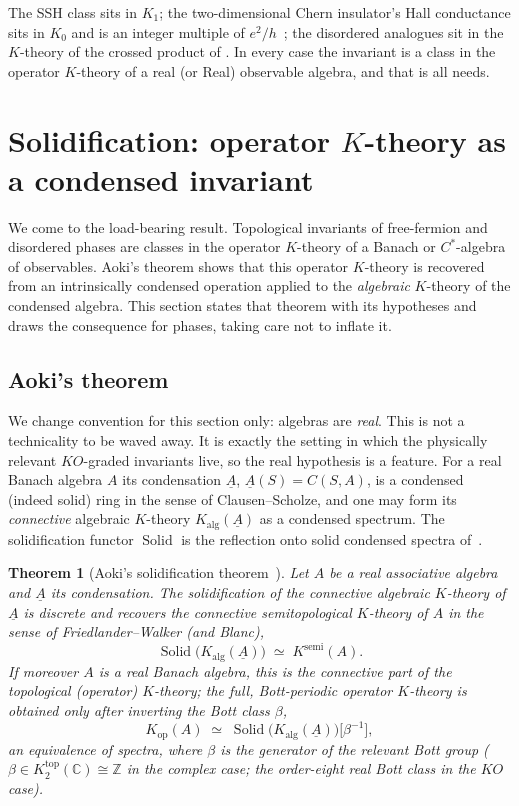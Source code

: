 \documentclass[12pt]{article}
\newcommand{\cond}[1]{\underline{#1}}          %
\newcommand{\Kop}{K_{\mathrm{op}}}             %
\newcommand{\Kalg}{K_{\mathrm{alg}}}           %
\newcommand{\Solid}{\operatorname{Solid}}      %
\newcommand{\CC}{\mathbb{C}}
\newcommand{\ZZ}{\mathbb{Z}}
\theoremstyle{plain}
\newtheorem{progthm}{Theorem}
\begin{document}
The SSH class sits in $K_{1}$; the two-dimensional Chern insulator's Hall conductance
sits in $K_{0}$ and is an integer multiple of $e^{2}/h$~\cite{tknn-1982}; the
disordered analogues sit in the $K$-theory of the crossed product of .
In every case the invariant is a class in the operator $K$-theory of a real (or Real)
observable algebra, and that is all  needs.

\section{Solidification: operator \texorpdfstring{$K$}{K}-theory as a condensed invariant}
\label{sec:aoki}

We come to the load-bearing result. Topological invariants of free-fermion and
disordered phases are classes in the operator $K$-theory of a Banach or
$C^{*}$-algebra of observables. Aoki's theorem shows that this operator $K$-theory is
recovered from an intrinsically condensed operation applied to the \emph{algebraic}
$K$-theory of the condensed algebra. This section states that theorem with its
hypotheses and draws the consequence for phases, taking care not to inflate it.

\subsection{Aoki's theorem}

We change convention for this section only: algebras are \emph{real}. This is not a
technicality to be waved away. It is exactly the setting in which the physically
relevant $KO$-graded invariants live, so the real hypothesis is a feature. For a
real Banach algebra $A$ its condensation $\cond{A}$, $\cond{A}(S)=C(S,A)$, is a
condensed (indeed solid) ring in the sense of Clausen--Scholze, and one may form its
\emph{connective} algebraic $K$-theory $\Kalg(\cond{A})$ as a condensed spectrum. The
solidification functor $\Solid$ is the reflection onto solid condensed spectra
of~\cite{clausen-scholze-condensed,clausen-scholze-analytic}.

\begin{progthm}[Aoki's solidification theorem~{\cite{aoki-solidification}}]
\label{thm:aoki}
Let $A$ be a real associative algebra and $\cond{A}$ its condensation. The
solidification of the \emph{connective} algebraic $K$-theory of $\cond{A}$ is discrete
and recovers the connective semitopological $K$-theory of $A$ in the sense of
Friedlander--Walker (and Blanc),
\[
  \Solid\bigl(\Kalg(\cond{A})\bigr) \;\simeq\; K^{\mathrm{semi}}(A).
\]
If moreover $A$ is a real Banach algebra, this is the \emph{connective part} of the
topological (operator) $K$-theory; the full, Bott-periodic operator $K$-theory is
obtained only after inverting the Bott class $\beta$,
\[
  \Kop(A) \;\simeq\; \Solid\bigl(\Kalg(\cond{A})\bigr)\bigl[\beta^{-1}\bigr],
\]
an equivalence of spectra, where $\beta$ is the generator of the relevant Bott group
($\beta\in K_{2}^{\mathrm{top}}(\CC)\cong\ZZ$ in the complex case; the order-eight
real Bott class in the $KO$ case).
\end{progthm}
\end{document}
